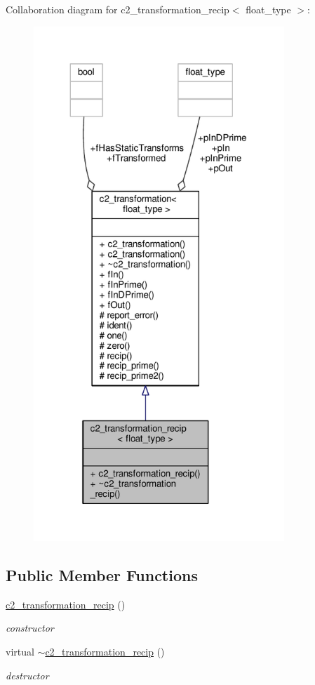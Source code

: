 Collaboration diagram for c2\+\_\+transformation\+\_\+recip$<$ float\+\_\+type $>$\+:
\nopagebreak
\begin{figure}[H]
\begin{center}
\leavevmode
\includegraphics[height=550pt]{classc2__transformation__recip__coll__graph}
\end{center}
\end{figure}
\subsection*{Public Member Functions}
\begin{DoxyCompactItemize}
\item 
\hyperlink{classc2__transformation__recip_ae02a2e64cf927343332eec0b5c9e2235}{c2\+\_\+transformation\+\_\+recip} ()
\begin{DoxyCompactList}\small\item\em constructor \end{DoxyCompactList}\item 
virtual \hyperlink{classc2__transformation__recip_ac154bb15973de9c28497726a3ca2a175}{$\sim$c2\+\_\+transformation\+\_\+recip} ()
\begin{DoxyCompactList}\small\item\em destructor \end{DoxyCompactList}\end{DoxyCompactItemize}
